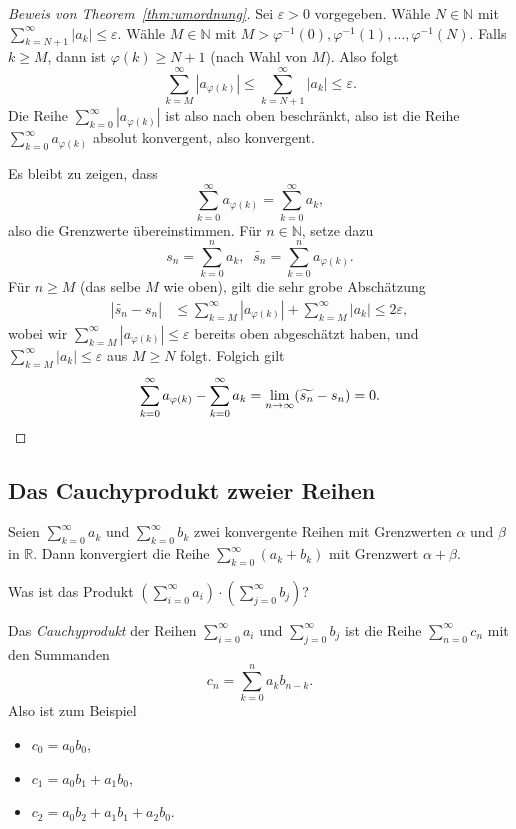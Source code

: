 \documentclass[../main.tex]{subfiles}
\begin{document}
\begin{proof}[Beweis von Theorem~\ref{thm:umordnung}]
  Sei $\varepsilon > 0$ 
  vorgegeben.
  Wähle $N \in \mathbb{N}$ 
  mit $\sum_{k=N+1}^{\infty} |a_k| \leq \varepsilon$.
  Wähle $M \in \mathbb{N}$ mit $M > \varphi^{-1}(0),
  \varphi^{-1}(1), \dots, \varphi^{-1}(N)$.
  Falls $k \geq M$, dann ist $\varphi(k) \geq N+1$
  (nach Wahl von $M$).
  Also folgt
  \[
   \sum_{k=M}^{\infty} |a_{\varphi(k)}| 
   \leq \sum_{k=N+1}^{\infty} |a_k| \leq \varepsilon.
  \]
  Die Reihe
  $\sum_{k=0}^{\infty} |a_{\varphi(k)}|$ ist also
  nach oben beschränkt,
  also ist die Reihe
  $\sum_{k=0}^{\infty} a_{\varphi(k)}$ absolut konvergent,
  also konvergent.

  Es bleibt zu zeigen, dass
  \[
    \sum_{k=0}^{\infty} a_{\varphi(k)} = \sum_{k=0}^{\infty} a_k,
  \]
  also die Grenzwerte übereinstimmen.
  Für $n \in \mathbb{N}$, setze dazu
  \[
    s_n = \sum_{k=0}^{n} a_k, \;\; \widetilde{s_n} =
    \sum_{k=0}^{n} a_{\varphi(k)}.
  \]
  Für $n \geq M$ (das selbe $M$ wie oben),
  gilt die sehr grobe Abschätzung
  \begin{align*}
    |\widetilde{s_n} - s_n| & \leq
    \sum_{k=M}^{\infty} |a_{\varphi(k)}|
    + \sum_{k=M}^{\infty} |a_k| \leq 2\varepsilon,
  \end{align*}
  wobei wir
  $\sum_{k=M}^{\infty} |a_{\varphi(k)}| \leq \varepsilon$ 
  bereits oben abgeschätzt haben,
  und $\sum_{k=M}^{\infty} |a_k| \leq \varepsilon$ aus
  $M \geq N$ folgt.
  Folgich gilt
  \[
    \sum_{k=0}^{\infty} a_{\varphi(k)}
    - \sum_{k=0}^{\infty} a_{k} =
    \lim_{n \to \infty}(\widetilde{s_n} - s_n) = 0. \qedhere
  \]
\end{proof}

\subsection*{Das Cauchyprodukt zweier Reihen}
Seien $\sum_{k=0}^{\infty} a_k$ und $\sum_{k=0}^{\infty} b_k$ 
zwei konvergente Reihen mit Grenzwerten
$\alpha$ und $\beta$ in $\mathbb{R}$.
Dann konvergiert die Reihe
$\sum_{k=0}^{\infty} (a_k + b_k)$ mit Grenzwert
$\alpha + \beta$.

\begin{question}
  Was ist das Produkt $\left( \sum_{i=0}^{\infty} a_i \right)
  \cdot \left( \sum_{j=0}^{\infty} b_j \right)$?
\end{question}

\begin{definition}
  Das \emph{Cauchyprodukt} der Reihen
  $\sum_{i=0}^{\infty} a_i$ und $\sum_{j=0}^{\infty} b_j$ 
  ist die Reihe $\sum_{n=0}^{\infty} c_n$ mit den Summanden
  \[
    c_n = \sum_{k=0}^{n} a_k b_{n-k}.
  \]
  Also ist zum Beispiel
  \begin{itemize}
    \item $c_0 = a_0 b_0$,
    \item $c_1 = a_0 b_1 + a_1 b_0$,
    \item $c_2 = a_0 b_2 + a_1 b_1 + a_2 b_0$.
  \end{itemize}
\end{definition}
\end{document}

